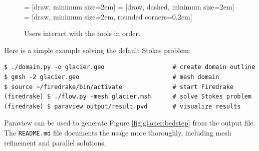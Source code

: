 \documentclass[letterpaper,final,12pt,reqno]{amsart}
\begin{document}
\begin{figure}[h]
\bigskip
{} = [draw, minimum size=2em]
 = [draw, dashed, minimum size=2em]
 = [draw, minimum size=2em, rounded corners=0.2cm]

\medskip
\caption{Users interact with the tools in order.}
\label{fig:blockdiagram}
\end{figure}

Here is a simple example solving the default Stokes problem:

\medskip
\begin{Verbatim}
$ ./domain.py -o glacier.geo                   # create domain outline
$ gmsh -2 glacier.geo                          # mesh domain
$ source ~/firedrake/bin/activate              # start Firedrake
(firedrake) $ ./flow.py -mesh glacier.msh      # solve Stokes problem
(firedrake) $ paraview output/result.pvd       # visualize results
\end{Verbatim}

\medskip
\noindent Paraview can be used to generate Figure \ref{fig:glacier:bedstep} from the output file.  The \verb|README.md| file documents the usage more thoroughly, including mesh refinement and parallel solutions.


\small

\bigskip


\end{document}
